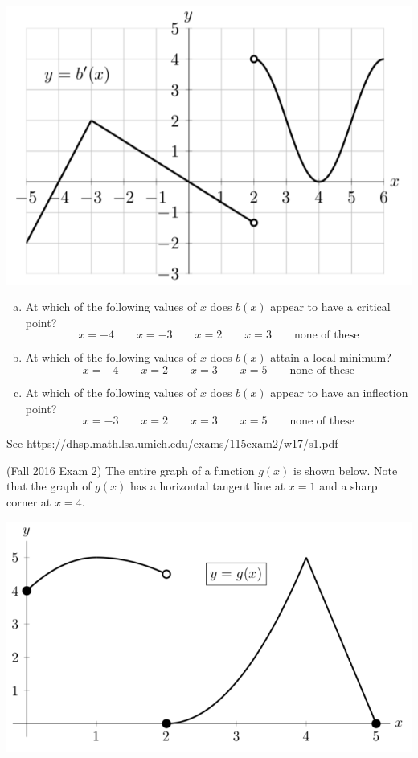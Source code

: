 \documentclass[11pt]{exam}
\begin{document}
\begin{questions}
\begin{center}
          \includegraphics[scale=0.4]{Winter2017Exam2Problem1}
        \end{center}
\begin{enumerate}[(a)]
	\item At which of the following values of $x$ does $b(x)$ appear to have a critical point?
		$$x=-4 \qquad x=-3 \qquad x=2 \qquad x=3 \qquad \textrm{none of these}$$
	\item At which of the following values of $x$ does $b(x)$ attain a local minimum?
	$$x=-4 \qquad x=2 \qquad x=3 \qquad x=5 \qquad \textrm{none of these}$$
	\item At which of the following values of $x$ does $b(x)$ appear to have an inflection point?
	$$x=-3 \qquad x=2 \qquad x=3 \qquad x=5 \qquad \textrm{none of these}$$
	\end{enumerate}
        \begin{solution}
          See \href{https://dhsp.math.lsa.umich.edu/exams/115exam2/w17/s1.pdf}{https://dhsp.math.lsa.umich.edu/exams/115exam2/w17/s1.pdf}
        \end{solution}
\question (Fall 2016 Exam 2) %
	The entire graph of a function $g(x)$ is shown below. Note that the graph of $g(x)$ has a horizontal tangent line at $x = 1$ and a sharp corner at $x = 4$.
        \begin{center}
          \includegraphics[scale=0.5]{Fall2016Exam2Problem6}

\end{center}
\end{questions}
\end{document}
